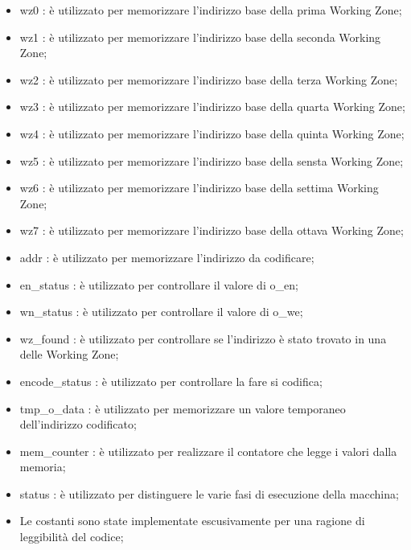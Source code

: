 \documentclass{article}
\begin{document}
\begin{itemize}
\item {\selectfont wz0} : è utilizzato per memorizzare l'indirizzo base della prima Working Zone;
\item {\selectfont wz1} : è utilizzato per memorizzare l'indirizzo base della seconda Working Zone;
\item {\selectfont wz2} : è utilizzato per memorizzare l'indirizzo base della terza Working Zone;
\item {\selectfont wz3} : è utilizzato per memorizzare l'indirizzo base della quarta Working Zone;
\item {\selectfont wz4} : è utilizzato per memorizzare l'indirizzo base della quinta Working Zone;
\item {\selectfont wz5} : è utilizzato per memorizzare l'indirizzo base della sensta Working Zone;
\item {\selectfont wz6} : è utilizzato per memorizzare l'indirizzo base della settima Working Zone;
\item {\selectfont wz7} : è utilizzato per memorizzare l'indirizzo base della ottava Working Zone;
\item {\selectfont addr} : è utilizzato per memorizzare l'indirizzo da codificare;
\item {\selectfont en\_status} : è utilizzato per controllare il valore di {\selectfont o\_en};
\item {\selectfont wn\_status} : è utilizzato per controllare il valore di {\selectfont o\_we};
\item {\selectfont wz\_found} : è utilizzato per controllare se l'indirizzo è stato trovato in una delle Working Zone;
\item {\selectfont encode\_status} : è utilizzato per controllare la fare si codifica;
\item {\selectfont tmp\_o\_data} : è utilizzato per memorizzare un valore temporaneo dell'indirizzo codificato;
\item {\selectfont mem\_counter} : è utilizzato per realizzare il contatore che legge i valori dalla memoria;
\item {\selectfont status} : è utilizzato per distinguere le varie fasi di esecuzione della macchina;
\item Le costanti sono state implementate escusivamente per una ragione di leggibilità del codice;
\end{itemize}
\pagebreak
\end{document}
